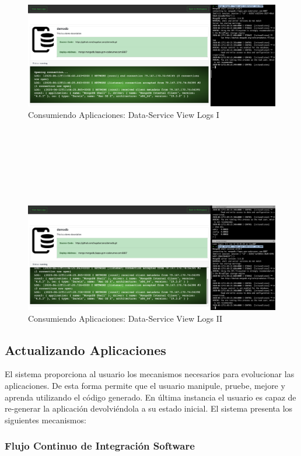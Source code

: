 \documentclass[a4paper,11pt]{book}
\begin{document}
\begin{figure}[H]
\centering
\includegraphics[scale=0.25]{imagenes/casouso_a/1_14.png}
\caption{  Consumiendo Aplicaciones: Data-Service View Logs I  }
\label{1_14}
\end{figure}
~\\
~\\
~\\
~\\
~\\
~\\
\begin{figure}[H]
\centering
\includegraphics[scale=0.25]{imagenes/casouso_a/1_15.png}
\caption{  Consumiendo Aplicaciones: Data-Service View Logs II }
\label{1_15}
\end{figure}


\subsection{Actualizando Aplicaciones}

El sistema proporciona al usuario los mecanismos necesarios para evolucionar las aplicaciones. De esta forma permite que el usuario manipule, pruebe, mejore y aprenda utilizando el código generado. En última instancia el usuario es capaz de re-generar la aplicación devolviéndola a su estado inicial. El sistema presenta los siguientes mecanismos:

\subsubsection{Flujo Continuo de Integración Software}
\end{document}
